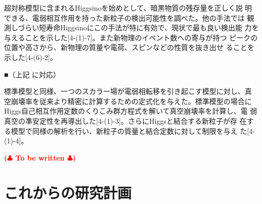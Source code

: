\documentclass[11pt,a4paper,twoside,dvipdfmx]{jarticle}		%
\def\rem#1{ {\bf\textcolor{red}{($\clubsuit$ #1 $\clubsuit$)}}}
\newcommand{\研究課題名}{粒子加速器を用いた電弱相互作用を持つ新物理の探索}
\newcommand{\研究機関名}{東京大学}
\newcommand{\申請者氏名}{千草颯}
\newcommand{\研究代表者氏名}{\申請者氏名}
\newcommand{\研究期間の最終元号年度}{34}	%
\begin{document}
{\vspace*{1mm}

超対称模型に含まれるHiggsinoを始めとして、暗黒物質の残存量を正しく説
明できる、電弱相互作用を持った新粒子の検出可能性を調べた。他の手法では
観測しづらい短寿命Higgsinoにこの手法が特に有効で、現状で最も良い検出能
力を与えることを示した[4-(1)-7]。また新物理のイベント数への寄与が持つ
ピークの位置や高さから、新物理の質量や電荷、スピンなどの性質を抜き出せ
ることを示した[4-(6)-2]。

\vspace*{1mm}

■（上記  に対応）

\vspace*{1mm}

標準模型と同様、一つのスカラー場が電弱相転移を引き起こす模型に対し、真
空崩壊率を従来より精密に計算するための定式化を与えた。標準模型の場合に
Higgs自己相互作用定数のくりこみ群方程式を解いて真空崩壊率を計算し、電
弱真空の準安定性を再導出した[4-(1)-3]。さらにHiggsと結合する新粒子が存
在する模型で同様の解析を行い、新粒子の質量と結合定数に対して制限を与え
た[4-(1)-4]。

\vspace*{1mm}


\vspace*{1mm}

\rem{To be written}

}

\section{これからの研究計画}
\end{document}
